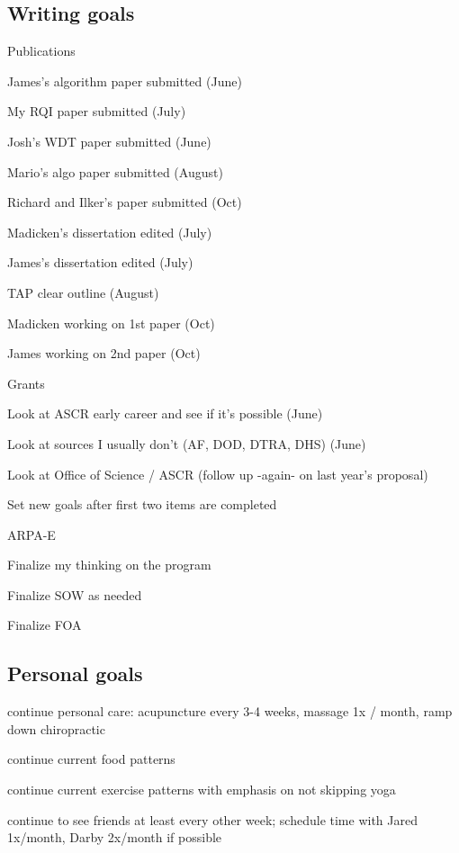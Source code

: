 \documentclass[12pt,twoside]{article}
\begin{document}
\subsection{Writing goals}
\begin{compactitem}
\item Publications
  \begin{compactitem}
  \item James's algorithm paper submitted (June)
  \item My RQI paper submitted (July)
  \item Josh's WDT paper submitted (June)
  \item Mario's algo paper submitted (August)
  \item Richard and Ilker's paper submitted (Oct)
  \item Madicken's dissertation edited (July)
  \item James's dissertation edited (July)
  \item TAP clear outline (August)
  \item Madicken working on 1st paper (Oct)
  \item James working on 2nd paper (Oct)
  \end{compactitem}

\item Grants
  \begin{compactitem}
  \item Look at ASCR early career and see if it's possible (June)
  \item Look at sources I usually don't (AF, DOD, DTRA, DHS) (June)
  \item Look at Office of Science / ASCR (follow up -again- on last year's proposal)
  \item Set new goals after first two items are completed
  \end{compactitem}
 
\item ARPA-E
  \begin{compactitem}
  \item Finalize my thinking on the program
  \item Finalize SOW as needed
  \item Finalize FOA
  \end{compactitem}
\end{compactitem}


\subsection{Personal goals}
\begin{compactitem}
\item continue personal care: acupuncture every 3-4 weeks, massage 1x / month, ramp down chiropractic
\item continue current food patterns
\item continue current exercise patterns with emphasis on not skipping yoga
\item continue to see friends at least every other week; schedule time with Jared 1x/month, Darby 2x/month if possible
\end{compactitem}
\end{document}
